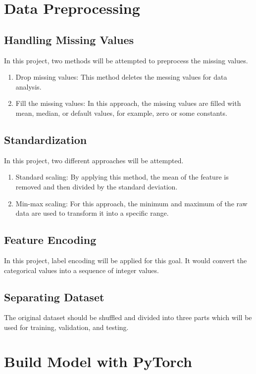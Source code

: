 \documentclass[12pt,twoside]{report}
\begin{document}
\section{Data Preprocessing}
\subsection{Handling Missing Values}
In this project, two methods will be attempted to preprocess the missing values.
\begin{enumerate}
	\item Drop missing values: This method deletes the messing values for data analysis.
	\item Fill the missing values: In this approach, the missing values are filled with mean, median, or default values, for example, zero or some constants.
\end{enumerate}

\subsection{Standardization}
In this project, two different approaches will be attempted. 
\begin{enumerate}
	\item Standard scaling: By applying this method, the mean of the feature is removed and then divided by the standard deviation. 
	\item Min-max scaling: For this approach, the minimum and maximum of the raw data are used to transform it into a specific range.
\end{enumerate}

\subsection{Feature Encoding}
In this project, label encoding will be applied for this goal. It would convert the categorical values into a sequence of integer values. 

\subsection{Separating Dataset}
The original dataset should be shuffled and divided into three parts which will be used for training, validation, and testing. 


\section{Build Model with PyTorch}
\end{document}
